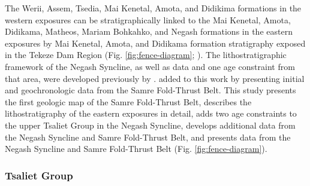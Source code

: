 The Werii, Assem, Tsedia, Mai Kenetal, Amota, and Didikima formations in the western exposures can be stratigraphically linked to the Mai Kenetal, Amota, Didikama, Matheos, Mariam Bohkahko, and Negash formations in the eastern exposures by Mai Kenetal, Amota, and Didikama formation stratigraphy exposed in the Tekeze Dam Region (Fig. \ref{fig:fence-diagram}; \citealp{Swanson-Hysell2015a}). The lithostratigraphic framework of the Negash Syncline, as well as \dC data and one age constraint from that area, were developed previously by \citet{Swanson-Hysell2015a}. \citet{MacLennan2018a} added to this work by presenting initial \dC and geochronologic data from the Samre Fold-Thrust Belt. This study presents the first geologic map of the Samre Fold-Thrust Belt, describes the lithostratigraphy of the eastern exposures in detail, adds two age constraints to the upper Tsaliet Group in the Negash Syncline, develops additional \dC data from the Negash Syncline and Samre Fold-Thrust Belt, and presents \SrSr data from the Negash Syncline and Samre Fold-Thrust Belt (Fig. \ref{fig:fence-diagram}).

\subsubsection{Tsaliet Group}

